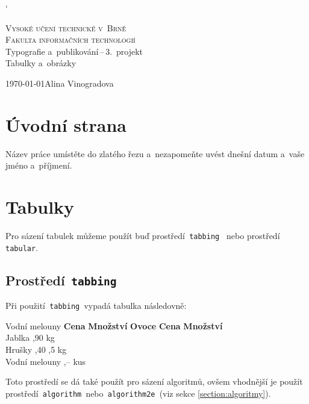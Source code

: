 \documentclass[11pt,a4paper]{article}
\begin{document}
	\catcode`
	\begin{titlepage}
		\begin{center}
		    \Huge\textsc{Vysoké učení technické v~Brně} \\
			\huge\textsc{Fakulta informačních technologií} \\
			\LARGE {Typografie a~publikování\,--\,3.~projekt} \\
			\Huge{Tabulky a~obrázky}
		\end{center}

		{\Large\today\hfill Alina Vinogradova}
    \end{titlepage}
    
\section{Úvodní strana}
    Název práce umístěte do zlatého řezu a~nezapomeňte uvést dnešní datum a~vaše jméno a~příjmení.

\section{Tabulky}
    Pro sázení tabulek můžeme použít buď prostředí\texttt{ tabbing } nebo prostředí\texttt{ tabular}.

\subsection{Prostředí\texttt{ tabbing}}
    Při použití\texttt{ tabbing }vypadá tabulka následovně:

\begin{tabbing}
		Vodní melouny \quad	\= \textbf{Cena} \quad	\= \textbf{Množství}	\kill
		\textbf{Ovoce}		\> \textbf{Cena}		\> \textbf{Množství}	\\
		Jablka				,90				 kg					\\
		Hrušky				,40				,5 kg				\\
		Vodní melouny		,--				 kus				\\
\end{tabbing}
    Toto prostředí se dá také použít pro sázení algoritmů, ovšem vhodnější je použít 
    prostředí\texttt{ algorithm }nebo\texttt{ algorithm2e }(viz sekce \ref{section:algoritmy}).
\end{document}
